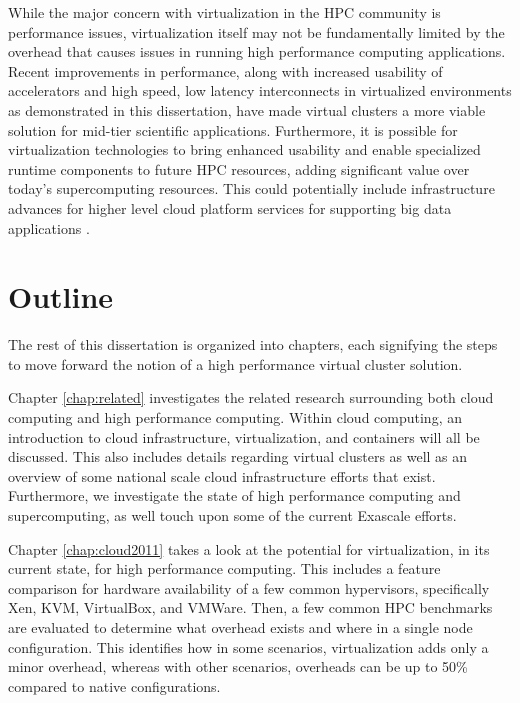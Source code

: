  
While the major concern with virtualization in the HPC community is performance issues, virtualization itself may not be fundamentally limited by the overhead that causes issues in running high performance computing applications. Recent improvements in performance, along with increased usability of accelerators and high speed, low latency interconnects in virtualized environments as demonstrated in this dissertation, have made virtual clusters a more viable solution for mid-tier scientific applications.  Furthermore, it is possible for  virtualization technologies to bring enhanced usability and enable specialized runtime components to future HPC resources, adding significant value over today's supercomputing resources.  This could potentially include infrastructure advances for higher level cloud platform services for supporting big data applications \cite{qiu2014towards}. 







\section{Outline}
\label{sec:outline}


The rest of this dissertation is organized into chapters, each signifying the steps to move forward the notion of a high performance virtual cluster solution.

Chapter \ref{chap:related} investigates the related research surrounding both cloud computing and high performance computing. Within cloud computing, an introduction to cloud infrastructure, virtualization, and containers will all be discussed. This also includes details regarding virtual clusters as well as an overview of some national scale cloud infrastructure efforts that exist. Furthermore, we investigate the state of high performance computing and supercomputing, as well touch upon some of the current Exascale efforts.

Chapter \ref{chap:cloud2011} takes a look at the potential for virtualization, in its current state, for high performance computing. This includes a feature comparison for hardware availability of a few common hypervisors, specifically Xen, KVM, VirtualBox, and VMWare. Then, a few common HPC benchmarks are evaluated to determine what overhead exists and where in a single node configuration. This identifies how in some scenarios, virtualization adds only a minor overhead, whereas with other scenarios, overheads can be up to 50\% compared to native configurations. 

